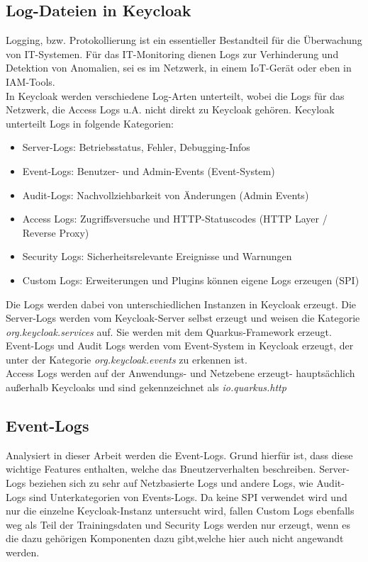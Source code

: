 \documentclass[a4paper,12pt]{article}
\begin{document}
	\subsection{Log-Dateien in Keycloak}
	Logging, bzw. Protokollierung ist ein essentieller Bestandteil für die Überwachung von IT-Systemen. Für das IT-Monitoring dienen Logs zur Verhinderung und Detektion von Anomalien, sei es im Netzwerk, in einem IoT-Gerät oder eben in IAM-Tools. 
	\\[0.5em]
	In Keycloak werden verschiedene Log-Arten unterteilt, wobei die Logs für das Netzwerk, die Access Logs u.A. nicht direkt zu Keycloak gehören.
	Kecyloak unterteilt Logs in folgende Kategorien:
	\begin{itemize}
		\item Server-Logs: Betriebsstatus, Fehler, Debugging-Infos
		\item Event-Logs: Benutzer- und Admin-Events (Event-System)
		\item Audit-Logs: Nachvollziehbarkeit von Änderungen (Admin Events)
		\item Access Logs: Zugriffsversuche und HTTP-Statuscodes (HTTP Layer / Reverse Proxy)
		\item Security Logs: Sicherheitsrelevante Ereignisse und Warnungen
		\item Custom Logs: Erweiterungen und Plugins können eigene Logs erzeugen (SPI)
	\end{itemize}
	Die Logs werden dabei von unterschiedlichen Instanzen in Keycloak erzeugt. Die Server-Logs werden  vom Keycloak-Server selbst erzeugt und weisen die Kategorie \textit{org.keycloak.services} auf. Sie werden mit dem Quarkus-Framework erzeugt.
	\\[0.5em]
	Event-Logs und Audit Logs werden vom Event-System in Keycloak erzeugt, der unter der Kategorie \textit{org.keycloak.events} zu erkennen ist.
	\\[0.5em]
	Access Logs werden auf der Anwendungs- und Netzebene erzeugt- hauptsächlich außerhalb Keycloaks und sind gekennzeichnet als \textit{io.quarkus.http}
	\\[0.5em]
	
	\subsection{Event-Logs}
	Analysiert in dieser Arbeit werden die Event-Logs. Grund hierfür ist, dass diese wichtige Features enthalten, welche das Bneutzerverhalten beschreiben. Server-Logs beziehen sich zu sehr auf Netzbasierte Logs und andere Logs, wie Audit-Logs sind Unterkategorien von Events-Logs. Da keine SPI verwendet wird und nur die einzelne Keycloak-Instanz untersucht wird, fallen Custom Logs ebenfalls weg als Teil der Trainingsdaten und Security Logs werden nur erzeugt, wenn es die dazu gehörigen Komponenten dazu gibt,welche hier auch nicht angewandt werden.
	\\[0.5em]
	
\end{document}
